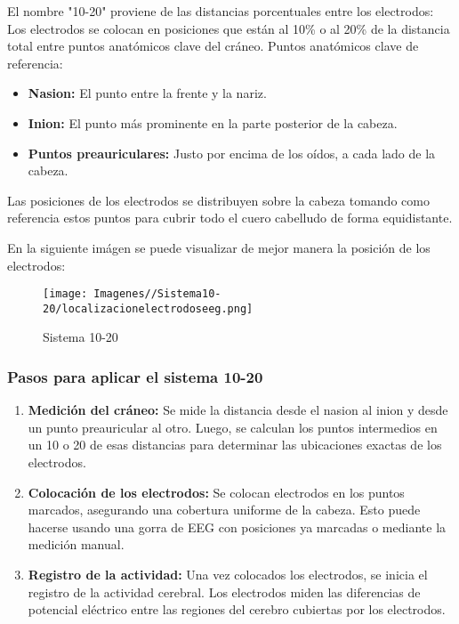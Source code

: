 \documentclass{article}
\begin{document}
El nombre "10-20" proviene de las distancias porcentuales entre los electrodos: Los electrodos se colocan en posiciones que están al 10\% o al 20\% de la distancia total entre puntos anatómicos clave del cráneo.
Puntos anatómicos clave de referencia:

\begin{itemize}

    \item \textbf{Nasion:} El punto entre la frente y la nariz.
    
    \item \textbf{Inion:} El punto más prominente en la parte posterior de la cabeza.
    
    \item \textbf{Puntos preauriculares:} Justo por encima de los oídos, a cada lado de la cabeza.
    
\end{itemize}

Las posiciones de los electrodos se distribuyen sobre la cabeza tomando como referencia estos puntos para cubrir todo el cuero cabelludo de forma equidistante.


En la siguiente imágen se puede visualizar de mejor manera la posición de los electrodos:

\begin{figure}[H]

    \centering
    
    \texttt{[image: Imagenes//Sistema10-20/localizacionelectrodoseeg.png]}
    \caption{Sistema 10-20}
    
\end{figure}

\subsubsection{Pasos para aplicar el sistema 10-20}

\begin{enumerate}

    \item \textbf{Medición del cráneo:} Se mide la distancia desde el nasion al inion y desde un punto preauricular al otro. Luego, se calculan los puntos intermedios en un 10 o 20 de esas distancias para determinar las ubicaciones exactas de los electrodos.
    
    \item \textbf{Colocación de los electrodos:} Se colocan electrodos en los puntos marcados, asegurando una cobertura uniforme de la cabeza. Esto puede hacerse usando una gorra de EEG con posiciones ya marcadas o mediante la medición manual.
    
    \item \textbf{Registro de la actividad:} Una vez colocados los electrodos, se inicia el registro de la actividad cerebral. Los electrodos miden las diferencias de potencial eléctrico entre las regiones del cerebro cubiertas por los electrodos.
    
\end{enumerate}
\end{document}

